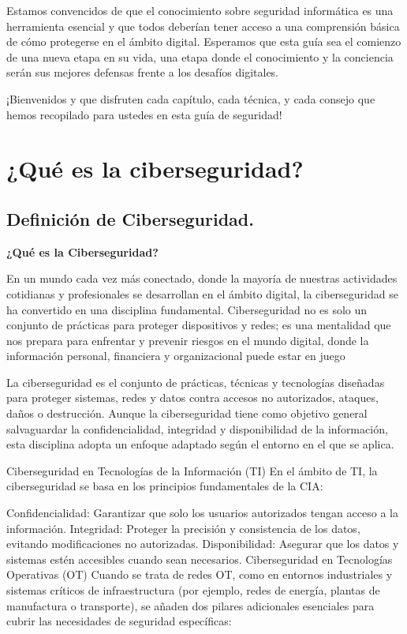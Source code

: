 \documentclass[
  letterpaper,
  DIV=11,
  numbers=noendperiod]{scrreprt}
\begin{document}
Estamos convencidos de que el conocimiento sobre seguridad informática
es una herramienta esencial y que todos deberían tener acceso a una
comprensión básica de cómo protegerse en el ámbito digital. Esperamos
que esta guía sea el comienzo de una nueva etapa en su vida, una etapa
donde el conocimiento y la conciencia serán sus mejores defensas frente
a los desafíos digitales.

¡Bienvenidos y que disfruten cada capítulo, cada técnica, y cada consejo
que hemos recopilado para ustedes en esta guía de seguridad!

\part{¿Qué es la ciberseguridad?}

\hypertarget{definiciuxf3n-de-ciberseguridad.}{%
\chapter{Definición de
Ciberseguridad.}\label{definiciuxf3n-de-ciberseguridad.}}

\textbf{¿Qué es la Ciberseguridad?}

En un mundo cada vez más conectado, donde la mayoría de nuestras
actividades cotidianas y profesionales se desarrollan en el ámbito
digital, la ciberseguridad se ha convertido en una disciplina
fundamental. Ciberseguridad no es solo un conjunto de prácticas para
proteger dispositivos y redes; es una mentalidad que nos prepara para
enfrentar y prevenir riesgos en el mundo digital, donde la información
personal, financiera y organizacional puede estar en juego

La ciberseguridad es el conjunto de prácticas, técnicas y tecnologías
diseñadas para proteger sistemas, redes y datos contra accesos no
autorizados, ataques, daños o destrucción. Aunque la ciberseguridad
tiene como objetivo general salvaguardar la confidencialidad, integridad
y disponibilidad de la información, esta disciplina adopta un enfoque
adaptado según el entorno en el que se aplica.

Ciberseguridad en Tecnologías de la Información (TI) En el ámbito de TI,
la ciberseguridad se basa en los principios fundamentales de la CIA:

Confidencialidad: Garantizar que solo los usuarios autorizados tengan
acceso a la información. Integridad: Proteger la precisión y
consistencia de los datos, evitando modificaciones no autorizadas.
Disponibilidad: Asegurar que los datos y sistemas estén accesibles
cuando sean necesarios. Ciberseguridad en Tecnologías Operativas (OT)
Cuando se trata de redes OT, como en entornos industriales y sistemas
críticos de infraestructura (por ejemplo, redes de energía, plantas de
manufactura o transporte), se añaden dos pilares adicionales esenciales
para cubrir las necesidades de seguridad específicas:
\end{document}
